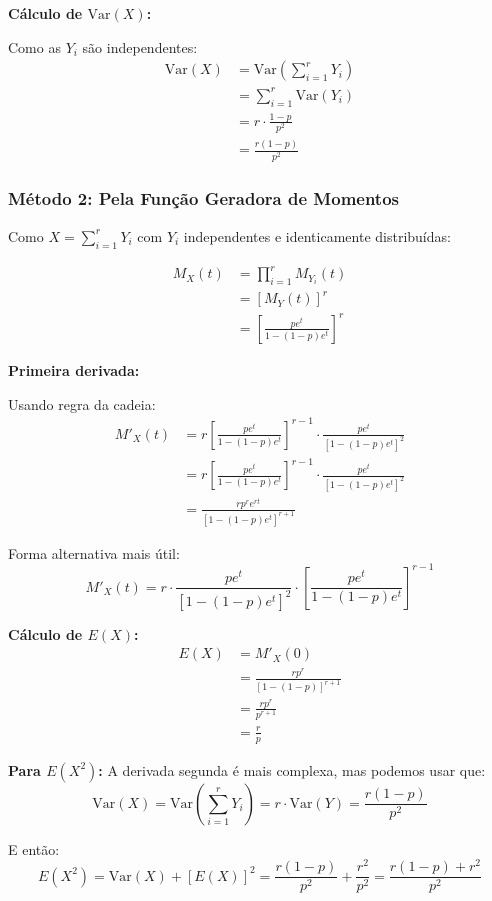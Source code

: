 \documentclass[12pt,a4paper]{article}
\theoremstyle{plain}
\theoremstyle{definition}
\theoremstyle{remark}
\begin{document}
\textbf{Cálculo de \(\text{Var}(X)\):}

Como as \(Y_i\) são independentes:
\begin{align}
\text{Var}(X) &= \text{Var}\left(\sum_{i=1}^r Y_i\right) \\
&= \sum_{i=1}^r \text{Var}(Y_i) \\
&= r \cdot \frac{1-p}{p^2} \\
&= \frac{r(1-p)}{p^2}
\end{align}

\subsubsection{Método 2: Pela Função Geradora de Momentos}

Como \(X = \sum_{i=1}^r Y_i\) com \(Y_i\) independentes e identicamente distribuídas:

\begin{align}
M_X(t) &= \prod_{i=1}^r M_{Y_i}(t) \\
&= [M_Y(t)]^r \\
&= \left[\frac{pe^t}{1-(1-p)e^t}\right]^r
\end{align}

\textbf{Primeira derivada:}

Usando regra da cadeia:
\begin{align}
M'_X(t) &= r\left[\frac{pe^t}{1-(1-p)e^t}\right]^{r-1} \cdot \frac{pe^t}{[1-(1-p)e^t]^2} \\
&= r\left[\frac{pe^t}{1-(1-p)e^t}\right]^{r-1} \cdot \frac{pe^t}{[1-(1-p)e^t]^2} \\
&= \frac{rp^re^{rt}}{[1-(1-p)e^t]^{r+1}}
\end{align}

Forma alternativa mais útil:
\[
M'_X(t) = r \cdot \frac{pe^t}{[1-(1-p)e^t]^2} \cdot \left[\frac{pe^t}{1-(1-p)e^t}\right]^{r-1}
\]

\textbf{Cálculo de \(E(X)\):}
\begin{align}
E(X) &= M'_X(0) \\
&= \frac{rp^r}{[1-(1-p)]^{r+1}} \\
&= \frac{rp^r}{p^{r+1}} \\
&= \frac{r}{p}
\end{align}

\textbf{Para \(E(X^2)\):} A derivada segunda é mais complexa, mas podemos usar que:
\[
\text{Var}(X) = \text{Var}\left(\sum_{i=1}^r Y_i\right) = r \cdot \text{Var}(Y) = \frac{r(1-p)}{p^2}
\]

E então:
\[
E(X^2) = \text{Var}(X) + [E(X)]^2 = \frac{r(1-p)}{p^2} + \frac{r^2}{p^2} = \frac{r(1-p) + r^2}{p^2}
\]
\end{document}

